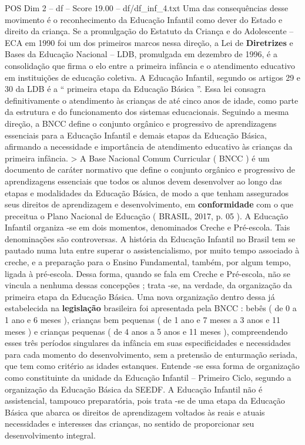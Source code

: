 \begin{textsample}{POS Dim 2 – df – Score 19.00 – df/df\_inf\_4.txt}
Uma das consequências desse movimento é o reconhecimento da Educação Infantil como dever do Estado e direito da criança.
Se a promulgação do Estatuto da Criança e do Adolescente – ECA em 1990 foi um dos primeiros marcos nessa direção, a Lei de \textbf{Diretrizes} e Bases da Educação Nacional – LDB, promulgada em dezembro de 1996, é a consolidação que firma o elo entre a primeira infância e o atendimento educativo em instituições de educação coletiva.
A Educação Infantil, segundo os artigos 29 e 30 da LDB é a “ primeira etapa da Educação Básica ”.
Essa lei consagra definitivamente o atendimento às crianças de até cinco anos de idade, como parte da estrutura e do funcionamento dos sistemas educacionais.
Seguindo a mesma direção, a BNCC define o conjunto orgânico e progressivo de aprendizagens essenciais para a Educação Infantil e demais etapas da Educação Básica, afirmando a necessidade e importância de atendimento educativo às crianças da primeira infância. > A Base Nacional Comum Curricular ( BNCC ) é um documento de caráter normativo que define o conjunto orgânico e progressivo de aprendizagens essenciais que todos os alunos devem desenvolver ao longo das etapas e modalidades da Educação Básica, de modo a que tenham assegurados seus direitos de aprendizagem e desenvolvimento, em \textbf{conformidade} com o que preceitua o Plano Nacional de Educação ( BRASIL, 2017, p. 05 ).
A Educação Infantil organiza -se em dois momentos, denominados Creche e Pré-escola.
Tais denominações são controversas.
A história da Educação Infantil no Brasil tem se pautado numa luta entre superar o assistencialismo, por muito tempo associado à creche, e a preparação para o Ensino Fundamental, também, por algum tempo, ligada à pré-escola.
Dessa forma, quando se fala em Creche e Pré-escola, não se vincula a nenhuma dessas concepções ; trata -se, na verdade, da organização da primeira etapa da Educação Básica.
Uma nova organização dentro dessa já estabelecida na \textbf{legislação} brasileira foi apresentada pela BNCC : bebês ( de 0 a 1 ano e 6 meses ), crianças bem pequenas ( de 1 ano e 7 meses a 3 anos e 11 meses ) e crianças pequenas ( de 4 anos a 5 anos e 11 meses ), compreendendo esses três períodos singulares da infância em suas especificidades e necessidades para cada momento do desenvolvimento, sem a pretensão de enturmação seriada, que tem como critério as idades estanques.
Entende -se essa forma de organização como constituinte da unidade da Educação Infantil – Primeiro Ciclo, segundo a organização da Educação Básica da SEEDF.
A Educação Infantil não é assistencial, tampouco preparatória, pois trata -se de uma etapa da Educação Básica que abarca os direitos de aprendizagem voltados às reais e atuais necessidades e interesses das crianças, no sentido de proporcionar seu desenvolvimento integral.

\end{textsample}

